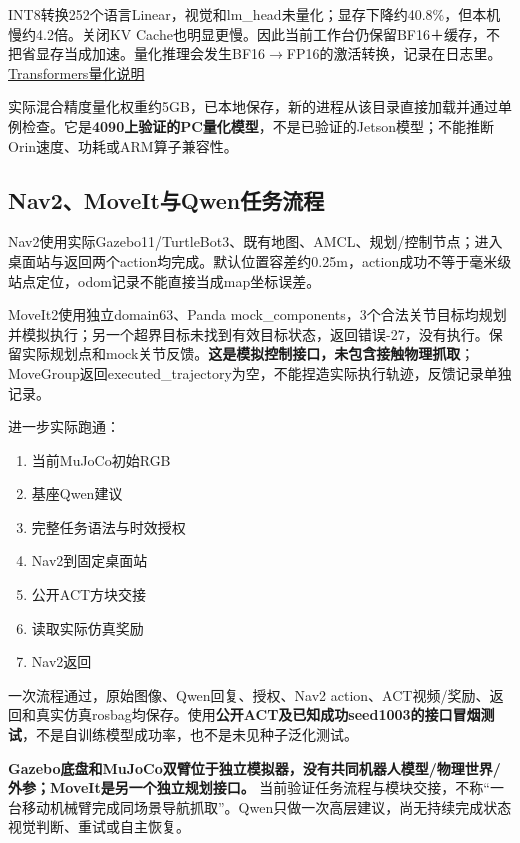 
INT8转换252个语言Linear，视觉和lm\_head未量化；显存下降约40.8\%，但本机慢约4.2倍。关闭KV Cache也明显更慢。因此当前工作台仍保留BF16＋缓存，不把省显存当成加速。量化推理会发生BF16\(\rightarrow\)FP16的激活转换，记录在日志里。\href{https://huggingface.co/docs/transformers/v4.57.0/quantization/bitsandbytes}{Transformers量化说明}

实际混合精度量化权重约5GB，已本地保存，新的进程从该目录直接加载并通过单例检查。它是\textbf{4090上验证的PC量化模型}，不是已验证的Jetson模型；不能推断Orin速度、功耗或ARM算子兼容性。

\subsection{Nav2、MoveIt与Qwen任务流程}\label{s04-detail-5}

Nav2使用实际Gazebo11/TurtleBot3、既有地图、AMCL、规划/控制节点；进入桌面站与返回两个action均完成。默认位置容差约0.25m，action成功不等于毫米级站点定位，odom记录不能直接当成map坐标误差。

MoveIt2使用独立domain63、Panda mock\_components，3个合法关节目标均规划并模拟执行；另一个超界目标未找到有效目标状态，返回错误-27，没有执行。保留实际规划点和mock关节反馈。\textbf{这是模拟控制接口，未包含接触物理抓取}；MoveGroup返回executed\_trajectory为空，不能捏造实际执行轨迹，反馈记录单独记录。

进一步实际跑通：

\begin{enumerate}
\def\labelenumi{\arabic{enumi}.}
\tightlist
\item
  当前MuJoCo初始RGB
\item
  基座Qwen建议
\item
  完整任务语法与时效授权
\item
  Nav2到固定桌面站
\item
  公开ACT方块交接
\item
  读取实际仿真奖励
\item
  Nav2返回
\end{enumerate}

一次流程通过，原始图像、Qwen回复、授权、Nav2 action、ACT视频/奖励、返回和真实仿真rosbag均保存。使用\textbf{公开ACT及已知成功seed1003的接口冒烟测试}，不是自训练模型成功率，也不是未见种子泛化测试。

\textbf{Gazebo底盘和MuJoCo双臂位于独立模拟器，没有共同机器人模型/物理世界/外参；MoveIt是另一个独立规划接口。} 当前验证任务流程与模块交接，不称``一台移动机械臂完成同场景导航抓取''。Qwen只做一次高层建议，尚无持续完成状态视觉判断、重试或自主恢复。

